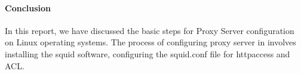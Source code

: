 \documentclass[12pt]{article}
\begin{document}
\paragraph{Conclusion\\}
In this report, we have discussed the basic steps for Proxy Server configuration on Linux operating systems. 
The process of configuring proxy server in involves 
installing the squid software, 
configuring the squid.conf file for http\textunderscore access and 
ACL.
\end{document}
